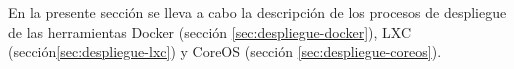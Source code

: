 En la presente sección se lleva a cabo la descripción de los procesos de despliegue de las herramientas Docker (sección \ref{sec:despliegue-docker}), LXC (sección\ref{sec:despliegue-lxc}) y CoreOS (sección \ref{sec:despliegue-coreos}). 
